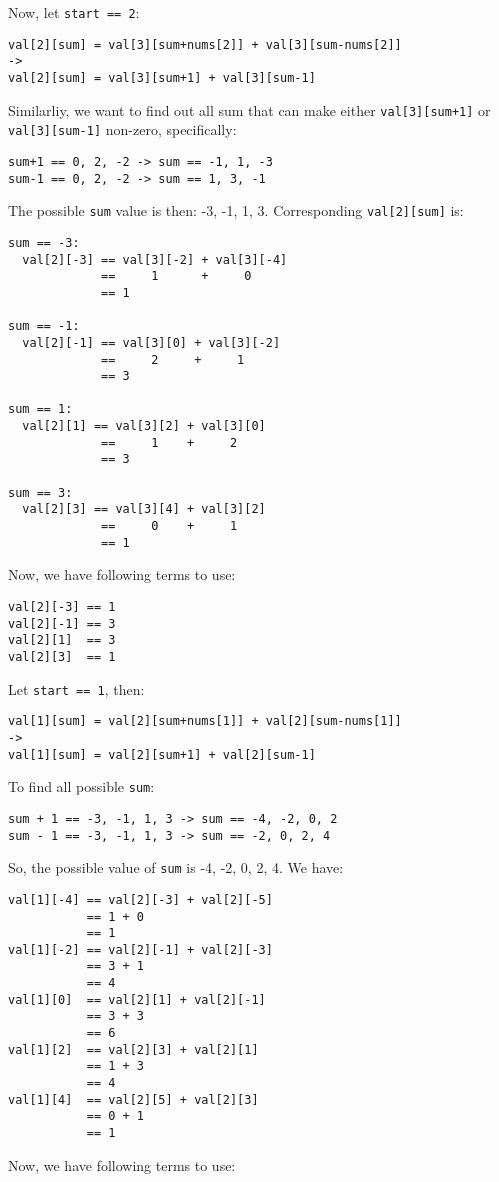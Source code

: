 \documentclass[12pt]{article}
\begin{document}
Now, let \texttt{start == 2}:
\begin{verbatim}
val[2][sum] = val[3][sum+nums[2]] + val[3][sum-nums[2]]
->
val[2][sum] = val[3][sum+1] + val[3][sum-1]
\end{verbatim}
Similarliy, we want to find out all sum that can make either \texttt{val[3][sum+1]} or \texttt{val[3][sum-1]} non-zero, specifically:
\begin{verbatim}
sum+1 == 0, 2, -2 -> sum == -1, 1, -3
sum-1 == 0, 2, -2 -> sum == 1, 3, -1
\end{verbatim}
The possible \texttt{sum} value is then: -3, -1, 1, 3. Corresponding \texttt{val[2][sum]} is:
\begin{verbatim}
sum == -3:
  val[2][-3] == val[3][-2] + val[3][-4]
             ==     1      +     0
             == 1

sum == -1:
  val[2][-1] == val[3][0] + val[3][-2]
             ==     2     +     1
             == 3

sum == 1:
  val[2][1] == val[3][2] + val[3][0]
             ==     1    +     2
             == 3

sum == 3:
  val[2][3] == val[3][4] + val[3][2]
             ==     0    +     1
             == 1             
\end{verbatim}
Now, we have following terms to use:
\begin{verbatim}
val[2][-3] == 1
val[2][-1] == 3
val[2][1]  == 3
val[2][3]  == 1
\end{verbatim}
Let \texttt{start == 1}, then:
\begin{verbatim}
val[1][sum] = val[2][sum+nums[1]] + val[2][sum-nums[1]]
->
val[1][sum] = val[2][sum+1] + val[2][sum-1]
\end{verbatim}
To find all possible \texttt{sum}:
\begin{verbatim}
sum + 1 == -3, -1, 1, 3 -> sum == -4, -2, 0, 2
sum - 1 == -3, -1, 1, 3 -> sum == -2, 0, 2, 4
\end{verbatim}
So, the possible value of \texttt{sum} is -4, -2, 0, 2, 4. We have:
\begin{verbatim}
val[1][-4] == val[2][-3] + val[2][-5]
           == 1 + 0
           == 1
val[1][-2] == val[2][-1] + val[2][-3]
           == 3 + 1
           == 4
val[1][0]  == val[2][1] + val[2][-1]
           == 3 + 3
           == 6
val[1][2]  == val[2][3] + val[2][1]
           == 1 + 3
           == 4
val[1][4]  == val[2][5] + val[2][3]
           == 0 + 1
           == 1           
\end{verbatim}
Now, we have following terms to use:
\end{document}
